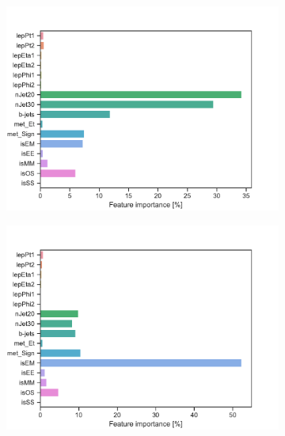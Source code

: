 \begin{figure}[H]
\begin{subfigure}[t!]{0.49\textwidth}
        \caption{}
        \label{fig:featSlepsnuLow}
    \end{subfigure}
    \begin{subfigure}[t!]{0.49\textwidth}
        \includegraphics[width = \textwidth]{Figures/WW/BDT/Low_level/Low/featureImportance.pdf}
        \caption{}
        \label{fig:featWWLow}
    \end{subfigure}
    \begin{subfigure}[t!]{0.49\textwidth}
        \includegraphics[width = \textwidth]{Figures/Mono_Z/ML/BDT/Low_level/Low/featureImportance.pdf}
        \caption{}
        \label{fig:featMonoZLow}
    \end{subfigure}
    \caption{}
    \label{fig:Non}
\end{figure}

